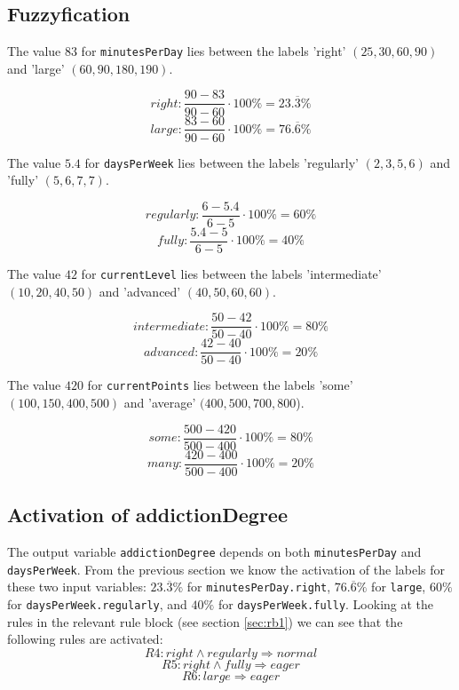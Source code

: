\subsection{Fuzzyfication}
\label{sub:fuzzyfic}

The value $83$ for \texttt{minutesPerDay} lies between the labels 'right' $(25,30,60,90)$ and 'large' $(60,90,180,190)$.

\[ right: \frac{90-83}{90-60} \cdot 100\% = 23.\overline{3}\% \]
\[ large: \frac{83-60}{90-60} \cdot 100\% = 76.\overline{6}\% \]
\vspace{1em}

The value $5.4$ for \texttt{daysPerWeek} lies between the labels 'regularly' $(2,3,5,6)$ and 'fully' $(5,6,7,7)$.

\[ regularly: \frac{6-5.4}{6-5} \cdot 100\% = 60\% \]
\[ fully: \frac{5.4-5}{6-5} \cdot 100\% = 40\% \]
\vspace{1em}

The value $42$ for \texttt{currentLevel} lies between the labels 'intermediate' $(10,20,40,50)$ and 'advanced' $(40,50,60,60)$.

\[ intermediate: \frac{50-42}{50-40} \cdot 100\% = 80\% \]
\[ advanced: \frac{42-40}{50-40} \cdot 100\% = 20\% \]
\vspace{1em}

The value $420$ for \texttt{currentPoints} lies between the labels 'some' $(100,150,400,500)$ and 'average' $(400,500,700,800$).

\[ some: \frac{500-420}{500-400} \cdot 100\% = 80\% \]
\[ many: \frac{420-400}{500-400} \cdot 100\% = 20\% \]
\vspace{1em}

\subsection{Activation of addictionDegree}

The output variable \texttt{addictionDegree} depends on both \texttt{minutesPerDay} and \texttt{daysPerWeek}. From the previous section we know the activation of the labels for these two input variables: $23.\overline{3}\%$ for \texttt{minutesPerDay.right}, $76.\overline{6}\%$ for \texttt{large}, $60\%$ for \texttt{daysPerWeek.regularly}, and $40\%$ for \texttt{daysPerWeek.fully}. Looking at the rules in the relevant rule block (see section \ref{sec:rb1}) we can see that the following rules are activated:
\[ R4: right \wedge regularly \Rightarrow normal \]
\[ R5: right \wedge fully \Rightarrow eager \]
\[ R6: large \Rightarrow eager \]

